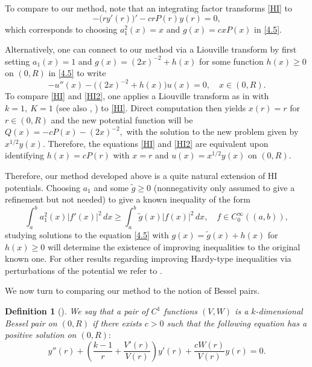 \documentclass[reqno,10pt,centertags]{amsart}
\newcommand{\wti}{\widetilde}
\numberwithin{equation}{section}
\newtheorem{definition}[theorem]{Definition}
\theoremstyle{remark}
\begin{document}
To compare to our method, note that an integrating factor transforms \eqref{HI} to
\begin{equation}
-\big(r y'(r)\big)'-cr P(r) y(r)=0,
\end{equation}
which corresponds to choosing $a_1^2(x)=x$ and $g(x)=cx P(x)$ in \eqref{4.5}. 

Alternatively, one can connect to our method via a Liouville transform by first setting $a_1(x)=1$ and $g(x)=(2x)^{-2}+h(x)$ for some function $h(x)\geq 0$ on $(0,R)$ in \eqref{4.5} to write
\begin{equation}\label{HI2}
-u''(x)-\big((2x)^{-2}+h(x)\big) u(x)=0,\quad x\in(0,R).
\end{equation}
To compare \eqref{HI} and \eqref{HI2}, one applies a Liouville transform as in \cite[Sect. 7]{Ev05} with $k=1,\ K=1$ (see also \cite[Sect. 4]{FPS25}, \cite[Thm. 3.5.1]{GNZ24}) to \eqref{HI}. Direct computation then yields $x(r)=r$ for $r\in(0,R)$ and the new potential function will be $Q(x)=-cP(x)-(2x)^{-2},$
with the solution to the new problem given by $x^{1/2}y(x)$.
Therefore, the equations \eqref{HI} and \eqref{HI2} are equivalent upon identifying $h(x)=cP(r)$ with $x=r$ and $u(x)=x^{1/2}y(x)$ on $(0,R)$.

Therefore, our method developed above is a quite natural extension of HI potentials. Choosing $a_1$ and some $\wti{g}\geq0$ (nonnegativity only assumed to give a refinement but not needed) to give a known inequality of the form
\begin{equation}
\int_a^b a_1^2(x) |f'(x)|^2\, dx \geq \int_a^b \wti{g}(x) |f(x)|^2\, dx,\quad f\in C^\infty_0((a,b)),
\end{equation}
studying solutions to the equation \eqref{4.5} with $g(x)=\wti{g}(x)+h(x)$ for $h(x)\geq0$ will determine the existence of improving inequalities to the original known one. For other results regarding improving Hardy-type inequalities via perturbations of the potential we refer to \cite{GNP23}.

We now turn to comparing our method to the notion of Bessel pairs.

\begin{definition}[{\cite[Sect. 1.3]{GM13}}]
We say that a pair of $C^1$ functions $(V,W)$ is a $k$-dimensional Bessel pair on $(0,R)$ if there exists $c>0$ such that the following equation has a positive solution on $(0,R)$$:$
\begin{equation}\label{3.12a}
y''(r)+\left(\frac{k-1}{r}+\frac{V'(r)}{V(r)}\right) y'(r)+\frac{c W(r)}{V(r)} y(r)=0.
\end{equation}
\end{definition}
\end{document}
